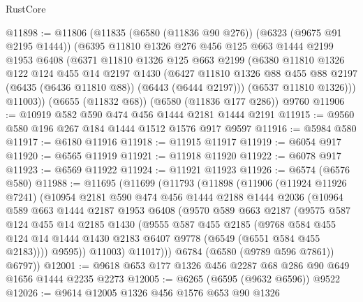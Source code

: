 \begin{lexlean}{RustCore}
\begin{coremodule}
@11898 := @11806
    (@11835
      (@6580 (@11836 @90 @276))
      (@6323 (@9675 @91 @2195 @1444))
      (@6395
        @11810
        @1326
        @276
        @456
        @125
        @663
        @1444
        @2199
        @1953
        @6408
        (@6371
          @11810
          @1326
          @125
          @663
          @2199
          (@6380
            @11810
            @1326
            @122
            @124
            @455
            @14
            @2197
            @1430
            (@6427 @11810 @1326 @88 @455 @88 @2197 (@6435 (@6436 @11810 @88)) (@6443 (@6444 @2197)))
            (@6537 @11810 @1326)))
        @11003))
    (@6655 (@11832 @68))
    (@6580 (@11836 @177 @286))
    @9760
@11906 := @10919 @582 @590 @474 @456 @1444 @2181 @1444 @2191
@11915 := @9560 @580 @196 @267 @184 @1444 @1512 @1576 @917 @9597
@11916 := @5984 @580
@11917 := @6180 @11916
@11918 := @11915 @11917
@11919 := @6054 @917
@11920 := @6565 @11919
@11921 := @11918 @11920
@11922 := @6078 @917
@11923 := @6569 @11922
@11924 := @11921 @11923
@11926 := @6574 (@6576 @580)
@11988 := @11695
    (@11699
      (@11793
        (@11898
          (@11906
            (@11924 @11926 @7241)
            (@10954
              @2181
              @590
              @474
              @456
              @1444
              @2188
              @1444
              @2036
              (@10964
                @589
                @663
                @1444
                @2187
                @1953
                @6408
                (@9570
                  @589
                  @663
                  @2187
                  (@9575
                    @587
                    @124
                    @455
                    @14
                    @2185
                    @1430
                    (@9555
                      @587
                      @455
                      @2185
                      (@9768
                        @584
                        @455
                        @124
                        @14
                        @1444
                        @1430
                        @2183
                        @6407
                        @9778
                        (@6549 (@6551 @584 @455 @2183))))
                    @9595))
                @11003)
              @11017)))
        @6784
        (@6580 (@9789 @596 @7861))
        @6797))
@12001 := @9618 @653 @177 @1326 @456 @2287 @68 @286 @90 @649 @1656 @1444 @2235 @2273
@12005 := @6265 (@6595 (@9632 @6596)) @9522
@12026 := @9614
    @12005
    @1326
    @456
    @1576
    @653
    @90
    @1326

\end{coremodule}
\end{lexlean}
